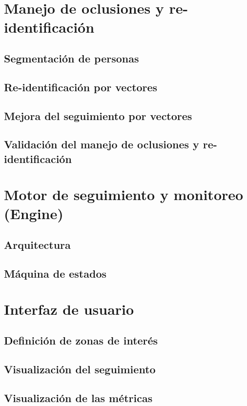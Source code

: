 
\section{Manejo de oclusiones y re-identificación}
\label{sec:oclusionesReID}

\subsection{Segmentación de personas}

\subsection{Re-identificación por vectores}

\subsection{Mejora del seguimiento por vectores}

\subsection{Validación del manejo de oclusiones y re-identificación}


\section{Motor de seguimiento y monitoreo (Engine)}
\label{sec:engine}

\subsection{Arquitectura}

\subsection{Máquina de estados}


\section{Interfaz de usuario}
\label{sec:gui}

\subsection{Definición de zonas de interés}

\subsection{Visualización del seguimiento}

\subsection{Visualización de las métricas}

